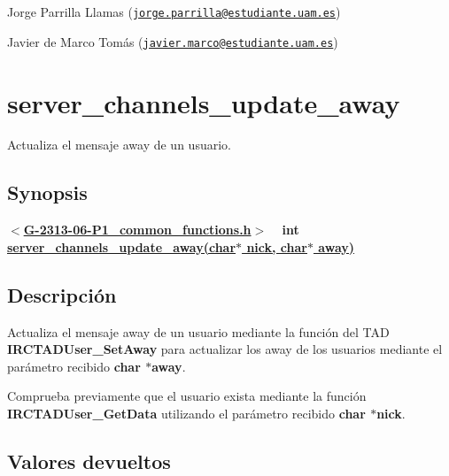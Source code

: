 \begin{DoxyItemize}
\item Jorge Parrilla Llamas (\href{mailto:jorge.parrilla@estudiante.uam.es}{\tt jorge.\+parrilla@estudiante.\+uam.\+es}) 
\item Javier de Marco Tomás (\href{mailto:javier.marco@estudiante.uam.es}{\tt javier.\+marco@estudiante.\+uam.\+es}) 
\end{DoxyItemize}\hypertarget{server_channels_update_away}{}\section{server\+\_\+channels\+\_\+update\+\_\+away}\label{server_channels_update_away}
Actualiza el mensaje away de un usuario.\hypertarget{server_channels_update_away_synopsis_server_channels_update_away}{}\subsection{Synopsis}\label{server_channels_update_away_synopsis_server_channels_update_away}
{ {\bfseries $<$\hyperlink{G-2313-06-P1__common__functions_8h}{G-\/2313-\/06-\/\+P1\+\_\+common\+\_\+functions.\+h}$>$} ~\newline
 {\bfseries int \hyperlink{G-2313-06-P1__common__functions_8c_af9aeb632d55a4cbbe842ab97001b5128}{server\+\_\+channels\+\_\+update\+\_\+away(char$\ast$ nick, char$\ast$ away)}} } \hypertarget{server_channels_update_away_descripcion_server_channels_update_away}{}\subsection{Descripción}\label{server_channels_update_away_descripcion_server_channels_update_away}
Actualiza el mensaje away de un usuario mediante la función del T\+A\+D {\bfseries I\+R\+C\+T\+A\+D\+User\+\_\+\+Set\+Away} para actualizar los away de los usuarios mediante el parámetro recibido {\bfseries char $\ast$away}. 

Comprueba previamente que el usuario exista mediante la función {\bfseries I\+R\+C\+T\+A\+D\+User\+\_\+\+Get\+Data} utilizando el parámetro recibido {\bfseries char $\ast$nick}.\hypertarget{server_channels_update_away_return_server_channels_update_away}{}\subsection{Valores devueltos}\label{server_channels_update_away_return_server_channels_update_away}

